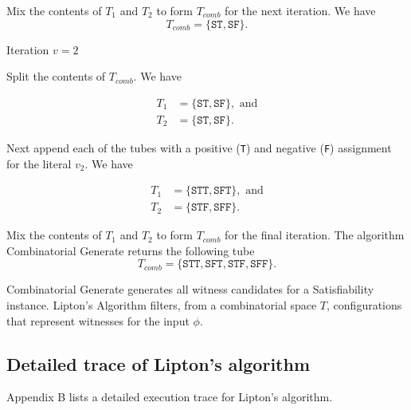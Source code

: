 Mix the contents of $T_1$ and $T_2$ to form $T_{comb}$ for the next iteration.  We have
\[
T_{comb} = \{\texttt{ST}, \texttt{SF}\}.
\]

\noindent Iteration $v = 2$

Split the contents of $T_{comb}$.  We have

\begin{align*}
 T_1 &= \{\texttt{ST}, \texttt{SF}\}, \text{ and} \\
 T_2 &= \{\texttt{ST}, \texttt{SF}\}.
\end{align*}

Next append each of the tubes with a positive (\texttt{T}) and negative (\texttt{F}) assignment for the literal $v_2$.  We have

\begin{align*}
 T_1 &= \{\texttt{STT}, \texttt{SFT}\}, \text{ and} \\
 T_2 &= \{\texttt{STF}, \texttt{SFF}\}.
\end{align*}

Mix the contents of $T_1$ and $T_2$ to form $T_{comb}$ for the final iteration.  The algorithm {\sc Combinatorial Generate} returns the following tube
\[
T_{comb} = \{\texttt{STT}, \texttt{SFT}, \texttt{STF}, \texttt{SFF}\}.
\]


{\sc Combinatorial Generate} generates all witness candidates for a {\sc Satisfiability} instance.  {\sc Lipton's Algorithm} filters, from a combinatorial space $T$, configurations that represent witnesses for the input $\phi$.


	
\FloatBarrier

	\subsection{Detailed trace of Lipton's algorithm}
	
Appendix B lists a detailed execution trace for Lipton's algorithm.


